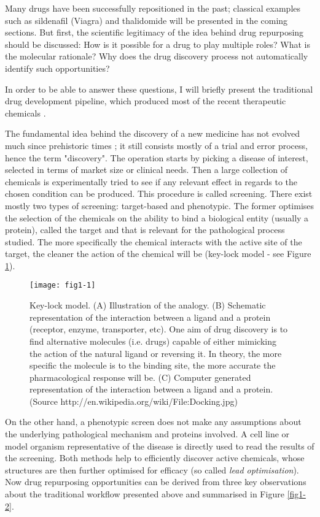 Many drugs have been successfully repositioned in the past; classical examples such as sildenafil (Viagra) and thalidomide will be presented in the coming sections. But first, the scientific legitimacy of the idea behind drug repurposing should be discussed: How is it possible for a drug to play multiple roles? What is the molecular rationale? Why does the drug discovery process not automatically identify such opportunities?

In order to be able to answer these questions, I will briefly present the traditional drug development pipeline, which produced most of the recent therapeutic chemicals \citep{swinney2011were}.

The fundamental idea behind the discovery of a new medicine has not evolved much since prehistoric times \citep{prehistoricwiki}; it still consists mostly of a trial and error process, hence the term "discovery". The operation starts by picking a disease of interest, selected in terms of market size or clinical needs. Then a large collection of chemicals is experimentally tried to see if any relevant effect in regards to the chosen condition can be produced. This procedure is called screening. There exist mostly two types of screening: target-based and phenotypic. The former optimises the selection of the chemicals on the ability to bind a biological entity (usually a protein), called the target and that is relevant for the pathological process studied. The more specifically the chemical interacts with the active site of the target, the cleaner the action of the chemical will be (key-lock model - see Figure \ref{fig1-1}).

\begin{figure}[ht]
    \centering
    \texttt{[image: fig1-1]}
    \caption{Key-lock model. (A) Illustration of the analogy. (B) Schematic representation of the interaction between a ligand and a protein (receptor, enzyme, transporter, etc). One aim of drug discovery is to find alternative molecules (i.e. drugs) capable of either mimicking the action of the natural ligand or reversing it. In theory, the more specific the molecule is to the binding site, the more accurate the pharmacological response will be. (C) Computer generated representation of the interaction between a ligand and a protein. (Source http://en.wikipedia.org/wiki/File:Docking.jpg)}
    \label{fig1-1}
\end{figure}

On the other hand, a phenotypic screen does not make any assumptions about the underlying pathological mechanism and proteins involved. A cell line or model organism representative of the disease is directly used to read the results of the screening. Both methods help to efficiently discover active chemicals, whose structures are then further optimised for efficacy (so called \emph{lead optimisation}). Now drug repurposing opportunities can be derived from three key observations \citep{barratt2012drug} about the traditional workflow presented above and summarised in Figure \ref{fig1-2}.

